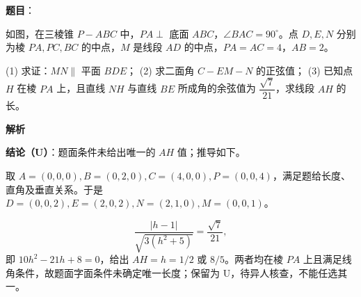 \begin{answer}

\textbf{题目}：

如图，在三棱锥 $P-ABC$ 中，$PA\perp$ 底面 $ABC$，$\angle BAC=90^\circ$。点 $D,E,N$ 分别为棱 $PA,PC,BC$ 的中点，$M$ 是线段 $AD$ 的中点，$PA=AC=4$，$AB=2$。
\nopagebreak[4]
\begin{center}\end{center}
\nopagebreak[4]
(1)   求证：$MN\parallel$ 平面 $BDE$；
(2)   求二面角 $C-EM-N$ 的正弦值；
(3)   已知点 $H$ 在棱 $PA$ 上，且直线 $NH$ 与直线 $BE$ 所成角的余弦值为 $\dfrac{\sqrt7}{21}$，求线段 $AH$ 的长。

\textbf{解析}

\textbf{结论（U）}：题面条件未给出唯一的 $AH$ 值；推导如下。

取 $A=(0,0,0),B=(0,2,0),C=(4,0,0),P=(0,0,4)$，满足题给长度、直角及垂直关系。于是 $D=(0,0,2),E=(2,0,2),N=(2,1,0),M=(0,0,1)$。

\nopagebreak[4]
\[
   \frac{|h-1|}{\sqrt{3(h^2+5)}}=\frac{\sqrt7}{21},
\]
   即 $10h^2-21h+8=0$，给出 $AH=h=1/2$ 或 $8/5$。两者均在棱 $PA$ 上且满足线角条件，故题面字面条件未确定唯一长度；保留为 U，待异人核查，不能任选其一。




\end{answer}
